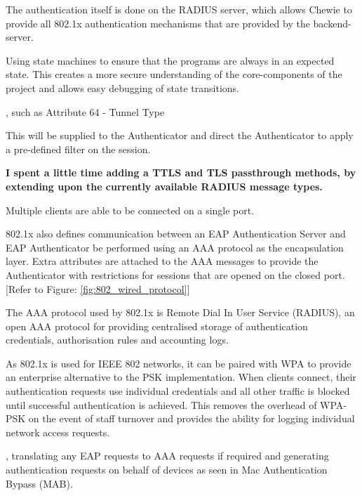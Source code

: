 The authentication itself is done on the RADIUS server, which allows Chewie to provide all 802.1x authentication mechanisms that are provided by the backend-server.





Using state machines to ensure that the programs are always in an expected state. This creates a more secure understanding of the core-components of the project and allows easy debugging of state transitions.



, such as Attribute 64 - Tunnel Type\cite{radius_attributes_iana}


This will be supplied to the Authenticator and direct the Authenticator to apply a pre-defined filter on the session. 




\textbf{I spent a little time adding a TTLS and TLS passthrough methods, by extending upon the currently available RADIUS message types.}



Multiple clients are able to be connected on a single port.






802.1x also defines communication between an EAP Authentication Server and EAP Authenticator be performed using an AAA protocol as the encapsulation layer. Extra attributes are attached to the AAA messages to provide the Authenticator with restrictions for sessions that are opened on the closed port.[Refer to Figure: \ref{fig:802_wired_protocol}]

The AAA protocol used by 802.1x is Remote Dial In User Service (RADIUS), an open AAA protocol for providing centralised storage of authentication credentials, authorisation rules and accounting logs.\cite{rfc_2904}

As 802.1x is used for IEEE 802 networks, it can be paired with WPA to provide an enterprise alternative to the PSK implementation. When clients connect, their authentication requests use individual credentials and all other traffic is blocked until successful authentication is achieved. This removes the overhead of WPA-PSK on the event of staff turnover and provides the ability for logging individual network access requests.


, translating any EAP requests to AAA requests if required and generating authentication requests on behalf of devices  as seen in Mac Authentication Bypass (MAB). 



